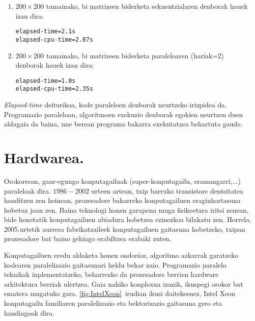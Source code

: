 \begin{enumerate}
\item $200 \times 200$ tamainako, bi matrizeen biderketa sekuentzialaren denborak hauek izan dira:
\begin{lstlisting}
elapsed-time=2.1s
elapsed-cpu-time=2.07s
\end{lstlisting}

\item $200 \times 200$ tamainako, bi matrizeen biderketa paraleloaren (hariak=$2$) denborak hauek izan dira:
\begin{lstlisting}
elapsed-time=1.0s
elapsed-cpu-time=2.35s
\end{lstlisting}
 
 
\end{enumerate}
 
\emph{Elapsed-time} deiturikoa, kode paraleloen denborak neurtzeko irizpidea da. Programazio paraleloan, algoritmoen exekuzio denborak egokien neurtzen duen aldagaia da baina, une berean programa bakarra exekutatzea behartuta gaude.       


\section{Hardwarea.}


Orokorrean, gaur-egungo konputagailuak (super-konputagailu, eramangarri,...) paraleloak dira. $1986-2002$ urteen artean, txip barruko transistore dentsitatea handitzen zen heinean, prozesadore bakarreko konputagailuen eraginkortasuna hobetuz joan zen. Baina teknologi honen garapena muga fisikoetara iritsi zenean, bide honetatik konputagailuen abiadura hobetzea ezinezkoa bilakatu zen. Horrela, 2005.urtetik aurrera fabrikatzaileek konputagailuen gaitasuna hobetzeko, txipan prozesadore bat baino gehiago erabiltzea erabaki zuten.  


Konputagailuen eredu aldaketa honen ondorioz, algoritmo azkarrak garatzeko kodearen paralelizazio gaitasunari heldu behar zaio. Programazio paralelo teknikak inplementatzeko, beharrezko da prozesadore berrien hardware arkitektura berriak ulertzea. Gaia nahiko konplexua izanik, ikuspegi orokor bat ematera mugatuko gara. \ref{fig:IntelXeon}~irudian ikusi daitekeenez, Intel Xeon konputagailu familiaren paralelizazio eta bektorizazio gaitasuna gero eta handiagoak dira.  


